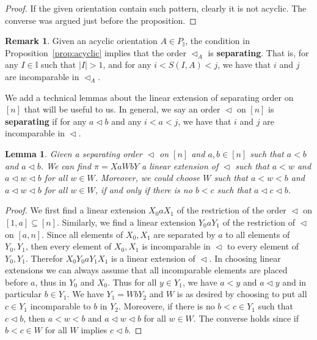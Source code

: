 \documentclass[reqno]{amsart}
\newtheorem{lemma}[theorem]{Lemma}
\theoremstyle{definition}
\newtheorem{remark}[theorem]{Remark}
\newcommand{\defn}[1]{\textbf{\textsf{\color{PineGreen} #1}}} %
\newcommand{\vincent}[1]{\todo[color=blue!30]{#1 \\ \hfill --- V.}}
\newcommand{\less}{\vartriangleleft} %
\newcommand{\II}{\mathbb I} %
\begin{document}
\begin{proof}
If the given orientation contain such pattern, clearly it is not acyclic. The converse was argued just before the proposition.
\vincent{Argue inside}
\end{proof}

\begin{remark} \label{rem:separation}
Given an acyclic orientation $A\in P_\II$,  the condition in Proposition~\ref{prop:acyclic} implies that the order $\less_A$ is \defn{separating}. That is, for any $I\in \II$ such that $|I|>1$,
and for any $i<S(I,A)<j$, we have that $i$ and $j$ are incomparable in $\less_A$. 
\end{remark}

We add a  technical lemmas about  the linear extension of separating order on $[n]$ that will be useful to us. In general, we say an order $\less$ on $[n]$ is \defn{separating} if 
for any $a\less b$ and any $i<a<j$, we have that $i$ and $j$ are incomparable in $\less$.

\begin{lemma} \label{lem:XaWbY}
Given a separating order $\less$ on $[n]$ and  $a,b\in [n]$ such that $a<b$ and $a\less b$. We can find $\pi= XaWbY$ a linear extension of $\less$ such that
$a<w$ and $a\less w\less b$ for all $w\in W$. Moreover, we could choose $W$ such that $a<w<b$ and $a\less w\less b$ for all $w\in W$, if and only if  there is no $b<c$ such that $a\less c\less b$.
\end{lemma}

\begin{proof} We first find a linear extension $X_0aX_1$ of the restriction of the order $\less$ on $[1,a]\subseteq [n]$.
Similarly, we find a linear extension $Y_0aY_1$ of the restriction of $\less$ on $[a,n]$. Since all elements of $X_0,X_1$ are separated by $a$ to all elements of $Y_0,Y_1$,
then every element of $X_0,X_1$ is incomparable in $\less$ to every element of $Y_0,Y_1$. Therefor $X_0Y_0aY_1X_1$ is a linear extension of $\less$.
In choosing linear extensions we can always assume that all incomparable elements  are placed before $a$, thus in $Y_0$ and $X_0$. 
Thus for all $y\in Y_1$, we have $a<y$ and $a\less y$ and in particular $b\in Y_1$. We have $Y_1=WbY_2$ and $W$ is as desired by choosing to put all  $c\in Y_1$ incomparable to $b$ in $Y_2$.
Moreovere, if there is no $b<c\in Y_1$ such that $c\less b$, then  $a<w<b$ and $a\less w\less b$ for all $w\in W$. The converse holds since if $b<c\in W$ for all $W$ implies $c\less b$.
\end{proof}
\end{document}
